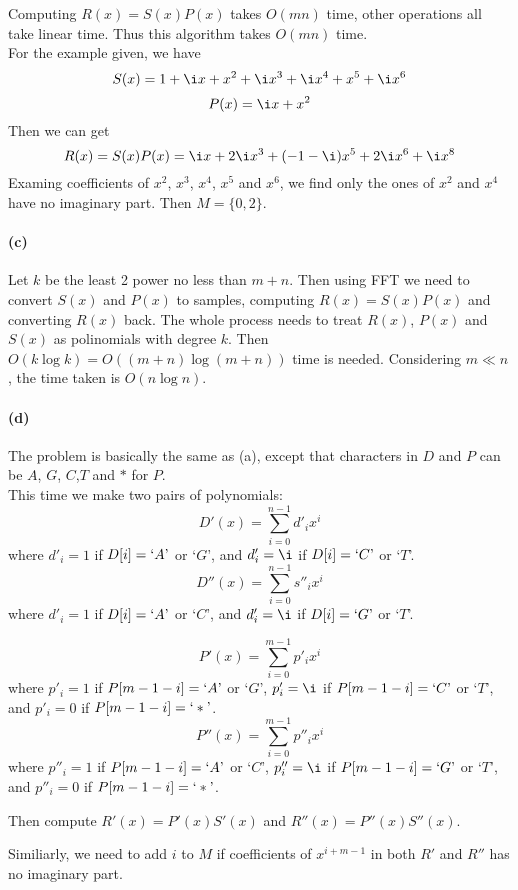 \documentclass{6046}
\begin{document}
Computing $R(x) = S(x)P(x)$ takes $O(mn)$ time, 
other operations all take linear time. 
Thus this algorithm takes 
$O(mn)$ time. 
\\

For the example given, 
we have 
$$S(x) = 1 + \i x + x^2 + \i x^3 + \i x^4 + x^5 + \i x^6$$
$$P(x) = \i x + x^2$$
Then we can get
$$R(x) = S(x)P(x) = \i x + 2\i x^3 + (-1-\i)x^5 + 2\i x^6 + \i x^8$$
Examing coefficients of $x^2$, $x^3$, $x^4$, $x^5$ and $x^6$, 
we find only the ones of $x^2$ and $x^4$ have no imaginary part. 
Then $M = \{ 0, 2 \}$. 
\\

\paragraph{(c)}
Let $k$ be the least 2 power no less than $m+n$. 
Then using FFT we need  
to convert $S(x)$ and $P(x)$ to samples, 
computing $R(x) = S(x)P(x)$ 
and converting $R(x)$ back. 
The whole process needs to treat 
$R(x)$, $P(x)$ and $S(x)$ as polinomials with degree $k$. 
Then $O(k\log{k}) = O((m+n)\log{(m+n)})$ time is needed. 
Considering $m \ll n$, 
the time taken is $O(n\log{n})$. 
\\

\paragraph{(d)}
The problem is basically the same as (a), 
except that characters in $D$ and $P$ can be $A$, $G$, $C$,$T$ 
and $*$ for $P$. 
\\

This time we make two pairs of polynomials:
$$D'(x) = \sum\limits_{i=0}^{n-1} d'_ix^i$$
where $d'_i = 1$ if $D[i] = ` A\textrm'$ or `$G$', 
and $d'_i = \i$ if $D[i] = `C\textrm'$ or `$T$'. 
$$D''(x) = \sum\limits_{i=0}^{n-1} s''_ix^i$$
where $d'_i = 1$ if $D[i] = ` A\textrm'$ or `$C$', 
and $d'_i = \i$ if $D[i] = `G\textrm'$ or `$T$'. 

$$P'(x) = \sum\limits_{i=0}^{m-1} p'_ix^i$$
where $p'_i = 1$ if $P[m-1-i] = `A\textrm'$ or `$G$', 
$p'_i = \i$ if $P[m-1-i] = `C\textrm'$ or `$T$', 
and $p'_i = 0$ if $P[m-1-i] = `*\textrm'$. 
$$P''(x) = \sum\limits_{i=0}^{m-1} p''_ix^i$$
where $p''_i = 1$ if $P[m-1-i] = `A\textrm'$ or `$C$', 
$p''_i = \i$ if $P[m-1-i] = `G\textrm'$ or `$T$', 
and $p''_i = 0$ if $P[m-1-i] = `*\textrm'$. 

Then compute $R'(x) = P'(x)S'(x)$ and $R''(x) = P''(x)S''(x)$. 

Similiarly, we need to add $i$ to $M$ 
if coefficients of $x^{i + m - 1}$ 
in both $R'$ and $R''$ 
has no imaginary part. 
\\
\end{document}
